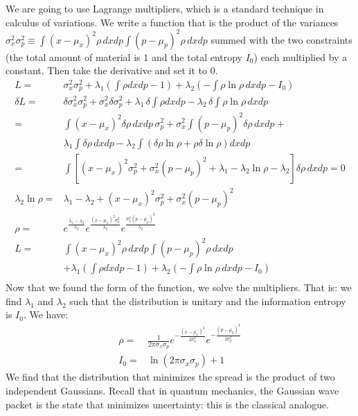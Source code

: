 \documentclass[aps,pra,10pt,floatfix,nofootinbib]{revtex4-1}
\theoremstyle{definition}
\begin{document}
We are going to use Lagrange multipliers, which is a standard technique in calculus of variations. We write a function that is the product of the variances $\sigma_x^2 \sigma_p^2 \equiv \int (x-\mu_x)^2 \rho \, dxdp \int (p-\mu_p)^2 \rho \, dxdp$ summed with the two constraints (the total amount of material is $1$ and the total entropy $I_0$) each multiplied by a constant. Then take the derivative and set it to $0$.
\begin{align*}
L = &\sigma_x^2 \sigma_p^2 + \lambda_1\left(\int \rho dxdp - 1\right) + \lambda_2\left(- \int \rho \ln \rho \, dxdp - I_0\right)\\
\delta L = & \delta \sigma_x^2 \sigma_p^2 + \sigma_x^2 \delta \sigma_p^2 +  \lambda_1 \, \delta \int \rho dxdp - \lambda_2 \, \delta \int \rho \ln \rho \, dxdp \\
= &\int  (x-\mu_x)^2 \delta \rho \, dxdp \, \sigma_p^2 +  \sigma_x^2 \int (p-\mu_p)^2 \delta \rho \, dxdp + \\ &\lambda_1 \int \delta\rho \, dxdp - \lambda_2 \int (\delta \rho \ln \rho + \rho \delta \ln \rho)dxdp  \\
= &\int [(x-\mu_x)^2 \sigma_p^2 + \sigma_x^2 (p-\mu_p)^2 + \lambda_1 - \lambda_2 \ln \rho - \lambda_2 ] \delta \rho  \, dxdp = 0 \\
\lambda_2 \ln \rho = &\lambda_1 - \lambda_2 + (x-\mu_x)^2 \sigma_p^2 + \sigma_x^2 (p-\mu_p)^2 \\
\rho = &e^{\frac{\lambda_1 - \lambda_2}{\lambda_2}}e^{\frac{(x-\mu_x)^2 \sigma_p^2}{\lambda_2}}e^{\frac{\sigma_x^2 (p-\mu_p)^2}{\lambda_2}}\\
L = &\int (x-\mu_x)^2 \rho \, dxdp \int (p-\mu_p)^2 \rho \, dxdp \\
&+ \lambda_1\left(\int \rho dxdp - 1\right) + \lambda_2\left(- \int \rho \ln \rho \, dxdp - I_0\right)\\
\end{align*}
Now that we found the form of the function, we solve the multipliers. That is: we find $\lambda_1$ and $\lambda_2$ such that the distribution is unitary and the information entropy is $I_0$. We have:
\begin{align*}
\rho = &\frac{1}{ 2 \pi \sigma_x \sigma_p} e^{-\frac{(x-\mu_x)^2}{2\sigma_x^2}} e^{-\frac{(p-\mu_p)^2}{2\sigma_p^2}} \\
I_0 = &\ln (2\pi\sigma_x\sigma_p) + 1
\end{align*}
We find that the distribution that minimizes the spread is the product of two independent Gaussians. Recall that in quantum mechanics, the Gaussian wave packet is the state that minimizes uncertainty: this is the classical analogue.
\end{document}
